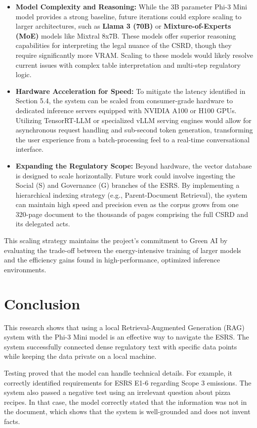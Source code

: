 \documentclass[12pt]{article}
\begin{document}
\begin{itemize}
    \item \textbf{Model Complexity and Reasoning:} While the 3B parameter Phi-3 Mini model provides a strong baseline, future iterations could explore scaling to larger architectures, such as \textbf{Llama 3 (70B)} or \textbf{Mixture-of-Experts (MoE)} models like Mixtral 8x7B. These models offer superior reasoning capabilities for interpreting the legal nuance of the CSRD, though they require significantly more VRAM. Scaling to these models would likely resolve current issues with complex table interpretation and multi-step regulatory logic.
    \item \textbf{Hardware Acceleration for Speed:} To mitigate the latency identified in Section 5.4, the system can be scaled from consumer-grade hardware to dedicated inference servers equipped with NVIDIA A100 or H100 GPUs. Utilizing TensorRT-LLM or specialized vLLM serving engines would allow for asynchronous request handling and sub-second token generation, transforming the user experience from a batch-processing feel to a real-time conversational interface.
    \item \textbf{Expanding the Regulatory Scope:} Beyond hardware, the vector database is designed to scale horizontally. Future work could involve ingesting the Social (S) and Governance (G) branches of the ESRS. By implementing a hierarchical indexing strategy (e.g., Parent-Document Retrieval), the system can maintain high speed and precision even as the corpus grows from one 320-page document to the thousands of pages comprising the full CSRD and its delegated acts.
\end{itemize}

This scaling strategy maintains the project's commitment to Green AI by evaluating the trade-off between the energy-intensive training of larger models and the efficiency gains found in high-performance, optimized inference environments.


\section{Conclusion}
This research shows that using a local Retrieval-Augmented Generation (RAG) system with the Phi-3 Mini model is an effective way to navigate the ESRS. The system successfully connected dense regulatory text with specific data points while keeping the data private on a local machine.

Testing proved that the model can handle technical details. For example, it correctly identified requirements for ESRS E1-6 regarding Scope 3 emissions. The system also passed a negative test using an irrelevant question about pizza recipes. In that case, the model correctly stated that the information was not in the document, which shows that the system is well-grounded and does not invent facts.
\end{document}
